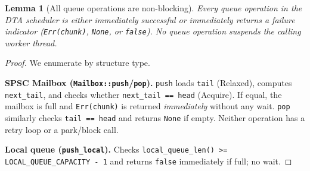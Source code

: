 \documentclass[11pt,a4paper]{article}
\newtheorem{lemma}[theorem]{Lemma}
\newcommand{\code}[1]{\texttt{#1}}
\begin{document}
\begin{lemma}[All queue operations are non-blocking]
\label{lem:nonblocking}
Every queue operation in the DTA scheduler is either immediately
successful or immediately returns a failure indicator
(\code{Err(chunk)}, \code{None}, or \code{false}).
No queue operation suspends the calling worker thread.
\end{lemma}

\begin{proof}
We enumerate by structure type.

\medskip
\textbf{SPSC Mailbox (\code{Mailbox::push}/\code{pop}).}
\code{push} loads \code{tail} (Relaxed), computes
\code{next\_tail}, and checks whether \code{next\_tail == head}
(Acquire).  If equal, the mailbox is full and \code{Err(chunk)} is
returned \emph{immediately} without any wait.  \code{pop} similarly
checks \code{tail == head} and returns \code{None} if empty.
Neither operation has a retry loop or a park/block call.

\medskip
\textbf{Local queue (\code{push\_local}).}
Checks \code{local\_queue\_len() >= LOCAL\_QUEUE\_CAPACITY - 1}
and returns \code{false} immediately if full; no wait.


\end{proof}
\end{document}
